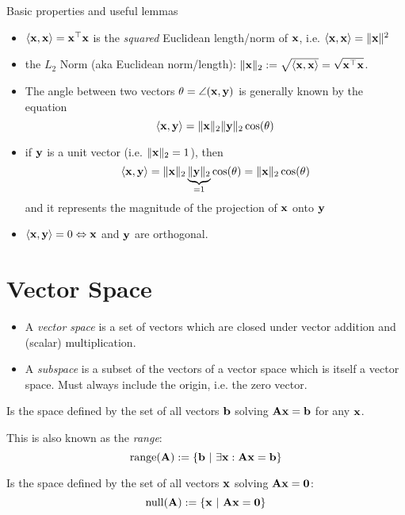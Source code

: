 Basic properties and useful lemmas
\begin{itemize}
\item \(\langle \mathbf{x}, \mathbf{x} \rangle = \mathbf{x}^\top \mathbf{x}\) is the \textit{squared} Euclidean length/norm of \(\mathbf{x}\), i.e. \(\langle \mathbf{x}, \mathbf{x} \rangle = \| \mathbf{x} \|^2\)
\item the \(L_2\) Norm (aka Euclidean norm/length): \(\| \mathbf{x} \|_2 := \sqrt{\langle \mathbf{x}, \mathbf{x} \rangle} = \sqrt{\mathbf{x}^\top \mathbf{x}}\).
\item The angle between two vectors \(\theta = \angle(\mathbf{x}, \mathbf{y})\) is generally known by the equation \[\langle \mathbf{x}, \mathbf{y} \rangle = \| \mathbf{x} \|_2 \| \mathbf{y} \|_2 \cos(\theta)\]
\item if \(\mathbf{y}\) is a unit vector (i.e. \(\| \mathbf{x} \|_2 = 1\)), then \[\langle \mathbf{x}, \mathbf{y} \rangle = \| \mathbf{x} \|_2 \underbrace{\| \mathbf{y} \|_2}_{= 1} \cos(\theta) = \| \mathbf{x} \|_2 \cos(\theta)\] and it represents the magnitude of the projection of \(\mathbf{x}\) onto \(\mathbf{y}\)
\item \(\langle \mathbf{x}, \mathbf{y} \rangle = 0 \Leftrightarrow \mathbf{x}\) and \(\mathbf{y}\) are orthogonal.
\end{itemize}

\section{Vector Space}
\begin{itemize}
\item A \textit{vector space} is a set of vectors which are closed under vector addition and (scalar) multiplication.
\item A \textit{subspace} is a subset of the vectors of a vector space which is itself a vector space. Must always include the origin, i.e. the zero vector.
\end{itemize}

\begin{definition}
Is the space defined by the set of all vectors \(\mathbf{b}\) solving \(\mathbf{A} \mathbf{x} = \mathbf{b}\) for any \(\mathbf{x}\).

This is also known as the \textit{range}: \[\operatorname{range}(\matr{A}) := \{\matr{b}\ |\ \exists \matr{x}: \matr{Ax} = \matr{b}\}\]
\end{definition}

\begin{definition}[Nullspace]
Is the space defined by the set of all vectors \(\mathbf{x}\) solving \(\mathbf{Ax} = \mathbf{0}\):
\[\operatorname{null}(\matr{A}) := \{\matr{x}\ |\ \matr{Ax} = \matr{0}\}\]
\end{definition}


